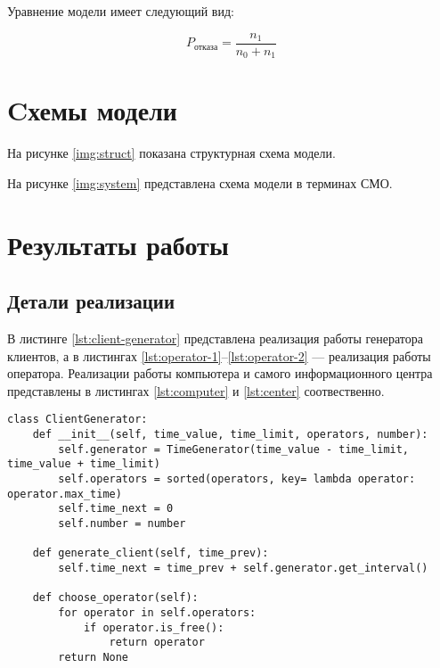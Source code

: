 Уравнение модели имеет следующий вид:

\begin{equation}
    P_{\text{отказа}} = \frac{n_{1}}{n_{0} + n_{1}}
\end{equation}

\section*{Cхемы модели}

На рисунке \ref{img:struct} показана структурная схема модели.


На рисунке \ref{img:system} представлена схема модели в терминах СМО.


\section*{Результаты работы}

\subsection*{Детали реализации}

В листинге \ref{lst:client-generator} представлена реализация работы генератора клиентов, а в листингах \ref{lst:operator-1}--\ref{lst:operator-2} --- реализация работы оператора.
Реализации работы компьютера и самого информационного центра представлены в листингах \ref{lst:computer} и \ref{lst:center} соотвественно.
\clearpage

\begin{center}
\captionsetup{justification=raggedright,singlelinecheck=off}
\begin{lstlisting}[label=lst:client-generator,caption=Реализация работы генератора клиентов]
class ClientGenerator:
    def __init__(self, time_value, time_limit, operators, number):
        self.generator = TimeGenerator(time_value - time_limit, time_value + time_limit)
        self.operators = sorted(operators, key= lambda operator: operator.max_time)
        self.time_next = 0
        self.number = number

    def generate_client(self, time_prev):
        self.time_next = time_prev + self.generator.get_interval()

    def choose_operator(self):
        for operator in self.operators:
            if operator.is_free():
                return operator
        return None
\end{lstlisting}
\end{center}

